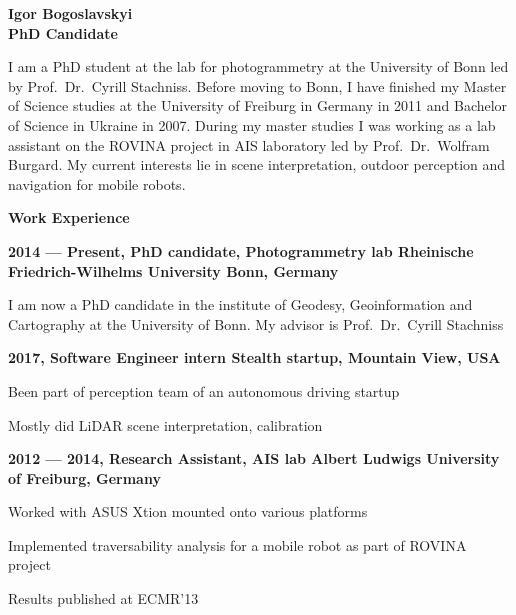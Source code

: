 \documentclass[a4paper,12pt,final]{memoir}
\newcommand{\Sep}{\vspace{1.5em}}
\newcommand{\SmallSep}{\vspace{0.5em}}
\newenvironment{AboutMe}
	{\ignorespaces}
	{\Sep\ignorespacesafterend}
\newcommand{\CVSection}[1]
	{\Large\textbf{#1}\par
	\SmallSep\normalsize\normalfont}
\newcommand{\CVItem}[1]
	{\textbf{\color{MidnightBlue} #1}}
\begin{document}
\framebreak{}


\Huge\bfseries {\color{MidnightBlue} Igor Bogoslavskyi} \\
\Large\bfseries  PhD Candidate \\

\normalsize\normalfont{}

\begin{AboutMe}
\newline
I am a PhD student at the lab for photogrammetry at the University of Bonn led
by Prof.~Dr.~Cyrill Stachniss. Before moving to Bonn, I have finished my
Master of Science studies at the University of Freiburg in Germany in 2011 and
Bachelor of Science in Ukraine in 2007. During my master studies I was working
as a lab assistant on the ROVINA project in AIS laboratory led by
Prof.~Dr.~Wolfram Burgard. My current interests lie in scene interpretation,
outdoor perception and navigation for mobile robots.
\end{AboutMe}

\CVSection{Work Experience}
\CVItem{2014 --- Present, PhD candidate, Photogrammetry lab
\newline Rheinische Friedrich-Wilhelms University Bonn, Germany}
\begin{compactitem}[\color{RoyalBlue}$\circ$]
\item I am now a PhD candidate in the institute of Geodesy, Geoinformation and
Cartography at the University of Bonn. My advisor is Prof.~Dr.~Cyrill
Stachniss
\end{compactitem}
\SmallSep

\CVItem{2017, Software Engineer intern
\newline Stealth startup, Mountain View, USA}
\begin{compactitem}[\color{MidnightBlue}$\circ$]
\item Been part of perception team of an autonomous driving startup
\item Mostly did LiDAR scene interpretation, calibration
\end{compactitem}

\CVItem{2012 --- 2014, Research Assistant, AIS lab
\newline Albert Ludwigs University of Freiburg, Germany}
\begin{compactitem}[\color{RoyalBlue}$\circ$]
\item Worked with ASUS Xtion mounted onto various platforms
\item Implemented traversability analysis for a mobile robot as part of ROVINA
project
\item Results published at ECMR'13
\end{compactitem}
\SmallSep
\end{document}

